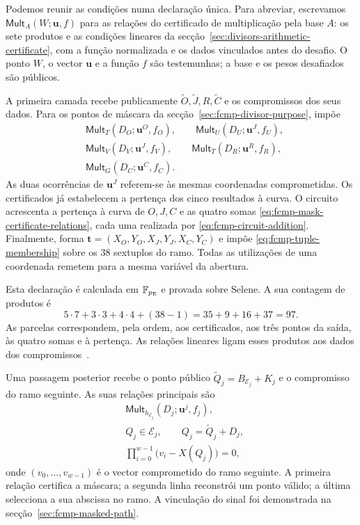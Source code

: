 Podemos reunir as condições numa declaração única. Para
abreviar, escrevamos
\(\mathsf{Mult}_A(W;\boldsymbol u,f)\) para as relações
do certificado de multiplicação pela base \(A\): os sete
produtos e as condições lineares da
secção~\ref{sec:divisors-arithmetic-certificate}, com a
função normalizada e os dados vinculados antes do desafio.
O ponto \(W\), o vector \(\boldsymbol u\) e a função
\(f\) são testemunhas; a base e os pesos desafiados são
públicos.

A primeira camada recebe publicamente
\(\widetilde O,\widetilde J,R,\widetilde C\) e os
compromissos dos seus dados. Para os pontos de máscara
da secção~\ref{sec:fcmp-divisor-purpose}, impõe
\[
 \begin{aligned}
 &\mathsf{Mult}_T(D_O;\boldsymbol u^{O},f_O),\qquad
   \mathsf{Mult}_U(D_U;\boldsymbol u^{J},f_U),\\
 &\mathsf{Mult}_V(D_V;\boldsymbol u^{J},f_V),\qquad
   \mathsf{Mult}_T(D_R;\boldsymbol u^{R},f_R),\\
 &\mathsf{Mult}_G(D_C;\boldsymbol u^{C},f_C).
 \end{aligned}
\]
As duas ocorrências de \(\boldsymbol u^{J}\) referem-se
às mesmas coordenadas comprometidas. Os certificados já
estabelecem a pertença dos cinco resultados à curva.
O circuito acrescenta a pertença à curva de \(O,J,C\)
e as quatro somas
\eqref{eq:fcmp-mask-certificate-relations}, cada uma
realizada por \eqref{eq:fcmp-circuit-addition}.
Finalmente, forma
\(\boldsymbol t=(X_O,Y_O,X_J,Y_J,X_C,Y_C)\) e impõe
\eqref{eq:fcmp-tuple-membership} sobre os 38 sextuplos
do ramo. Todas as utilizações de uma coordenada remetem
para a mesma variável da abertura.

Esta declaração é calculada em \(\mathbb F_{p_{\rm E}}\)
e provada sobre Selene. A sua contagem de produtos é
\begin{equation}
 5\cdot7+3\cdot3+4\cdot4+(38-1)
       =35+9+16+37=97.
 \label{eq:fcmp-leaf-rows}
\end{equation}
As parcelas correspondem, pela ordem, aos certificados,
aos três pontos da saída, às quatro somas e à pertença.
As relações lineares ligam esses produtos aos dados
dos compromissos~\cite{monero-oxide-fcmp-source}.

Uma passagem posterior recebe o ponto público
\(\widetilde Q_j=B_{\mathcal E_j}+K_j\) e o compromisso
do ramo seguinte. As suas relações principais são
\begin{equation}
 \begin{aligned}
 &\mathsf{Mult}_{h_{\mathcal E_j}}
       (D_j;\boldsymbol u^{j},f_j),\\
 &Q_j\in\mathcal E_j,\qquad
       Q_j=\widetilde Q_j+D_j,\\
 &\prod_{i=0}^{w-1}\bigl(v_i-X(Q_j)\bigr)=0,
 \end{aligned}
 \label{eq:fcmp-additional-layer}
\end{equation}
onde \((v_0,\ldots,v_{w-1})\) é o vector comprometido
do ramo seguinte. A primeira relação certifica a máscara;
a segunda linha reconstrói um ponto válido; a última
selecciona a sua abscissa no ramo. A vinculação do sinal
foi demonstrada na secção~\ref{sec:fcmp-masked-path}.

